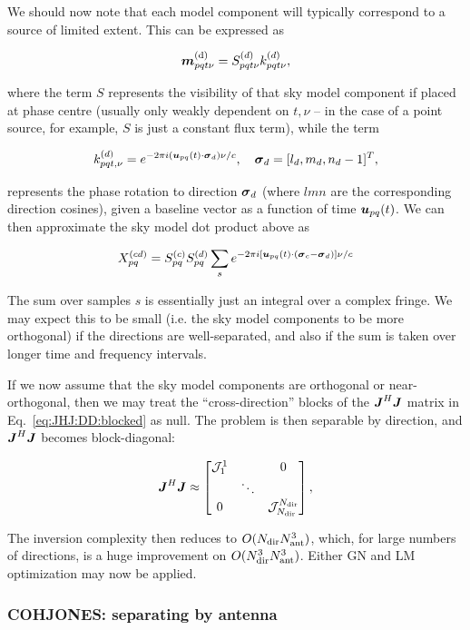 \documentclass[useAMS,usenatbib]{mn2e}
\newcommand{\mat}[1]{{\bmath{#1}}}
\newcommand{\JJ}{\mat{J}} %
\newcommand{\JHJ}{\JJ^H\JJ} %
\begin{document}
We should now note that each model component will typically correspond to a source of limited extent. This can be 
expressed as

\[
\bmath{m}_{pqt\nu}^\mathrm{(d)} = S^{(d)}_{pqt\nu} k^{(d)}_{pqt\nu}, 
\]

where the term $S$ represents the visibility of that sky model component if placed at phase centre (usually 
only weakly dependent on $t,\nu$ -- in the case of a point source, for example, $S$ is just a constant flux term),
while the term

\[
k^{(d)}_{pqt,\nu} = e^{-2\pi i (\bmath{u}_{pq}(t)\cdot\bmath{\sigma}_d)\nu/c},~~~\bmath{\sigma}_d = [l_d,m_d,n_d-1]^T,
\]

represents the phase rotation to direction $\bmath{\sigma}_d$ (where $lmn$ are the corresponding direction cosines), 
given a baseline vector as a function of time $\bmath{u}_{pq}(t)$. We can then approximate the sky model dot product above as

\[
X_{pq}^{(cd)} = S^{(c)}_{pq}S^{(d)}_{pq} \sum_s e^{-2\pi i [\bmath{u}_{pq}(t)\cdot(\bmath{\sigma}_c-\bmath{\sigma}_d) ]\nu/c}
\]

The sum over samples $s$ is essentially just an integral over a complex fringe. We may expect this to be small (i.e. the
sky model components to be more orthogonal) if the directions are well-separated, and also if the sum is taken 
over longer time and frequency intervals. 

If we now assume that the sky model components are orthogonal or near-orthogonal, then 
we may treat the ``cross-direction'' blocks of the $\JHJ$ matrix in Eq.~\ref{eq:JHJ:DD:blocked} as null. The problem is 
then separable by direction, and $\JHJ$ becomes block-diagonal:


\begin{equation}
\label{eq:JHJ:DD:block-diag}
\JHJ \approx \Matrix{ccc}{\JJJ^1_1 &  & 0 \\
& \ddots &  \\
0 & & \JJJ_{\Nd}^{\Nd} },
\end{equation}

The inversion complexity then reduces to $O(N_\mathrm{dir}N_\mathrm{ant}^3)$, which, for large numbers of directions, is a huge improvement on 
$O(N_\mathrm{dir}^3N_\mathrm{ant}^3)$. Either GN and LM optimization may now be applied. 



\subsubsection{COHJONES: separating by antenna}
\end{document}

